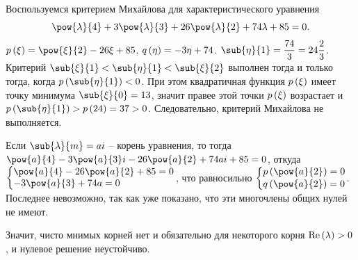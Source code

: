 \documentclass[a5paper,10pt]{article}
\begin{document}
Воспользуемся критерием Михайлова для характеристического уравнения 
$$\pow{\lambda}{4} + 3\pow{\lambda}{3} + 26\pow{\lambda}{2} + 74\lambda + 85 = 0.$$
$p\br{\xi} = \pow{\xi}{2} - 26\xi + 85$,
$q\left(\hspace{0.01em}\eta\hspace{0.01em}\right) = -3\eta + 74$.
$\sub{\eta}{1} = \dfrac {74} {3} = 24 \dfrac {2}{3}$.
Критерий $\sub{\xi}{1} < \sub{\eta}{1} < \sub{\xi}{2}$ 
выполнен тогда и только тогда, когда $p\br{\sub{\eta}{1}} < 0$.
При этом квадратичная функция $p\left(\hspace{0.01em}\xi\hspace{0.01em}\right)$ имеет точку минимума 
$\sub{\xi}{0} = 13$,
значит правее этой точки $p\left(\hspace{0.01em}\xi\hspace{0.01em}\right)$ возрастает и
$p\br{\sub{\eta}{1}} > p\br{24} = 37 > 0$. 
Следовательно, критерий Михайлова не выполняется.

Если $\sub{\lambda}{m} = ai$ -- корень уравнения, 
то тогда $\pow{a}{4} - 3\pow{a}{3} i - 26\pow{a}{2} + 74 ai + 85 = 0$,
откуда
$\tsys{\pow{a}{4} - 26\pow{a}{2} + 85 = 0 
    \\ -3\pow{a}{3} + 74a = 0}$, что равносильно
$\tsys{p\br{\pow{a}{2}} = 0 \vspace{0.1em} \\ q\br{\pow{a}{2}} = 0}$.
Последнее невозможно, так как уже показано, что эти многочлены общих нулей не имеют.

Значит, чисто мнимых корней нет и обязательно для некоторого корня 
$\operatorname{Re}\left(\hspace{0.01em}\lambda\hspace{0.01em}\right) > 0$,
и нулевое решение неустойчиво.
\end{document}
